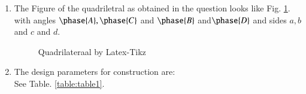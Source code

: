 \renewcommand{\theequation}{\theenumi}
\begin{enumerate}[label=\thesection.\arabic*.,ref=\thesection.\theenumi]
\item The Figure of the quadriletral as obtained in the question looks like Fig. \ref{fig:quadrilateral}.
with angles $\phase{ A},\phase{ C}$ and $\phase{ B}$ and$\phase{D}$ and sides $a, b$ and $c$ and $d$.


\begin{figure}[!ht]
\centering
\resizebox{\columnwidth}{!}{}
\caption{Quadrilateraal by Latex-Tikz}
\label{fig:quadrilateral}	
\end{figure}
%
%
%
\item The design parameters for construction are:
\label{const:table1}
\\
\solution See Table. \ref{table:table1}. 
%
\begin{table}[ht!]
\centering

\caption{To construct Quadrilateral ABCD}
\label{table:table1}	
\end{table}


\end{enumerate}
